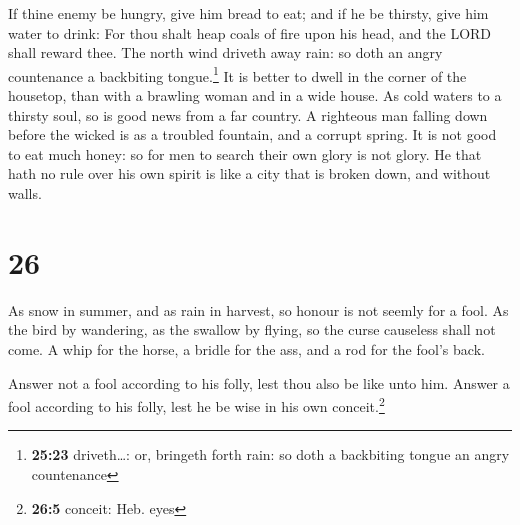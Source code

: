  If thine enemy be hungry, give him bread to eat; and if
he be thirsty, give him water to drink:  For thou shalt
heap coals of fire upon his head, and the LORD shall reward thee.
 The north wind driveth away rain: so doth an angry
countenance a backbiting tongue.\footnote{\textbf{25:23} driveth\ldots:
  or, bringeth forth rain: so doth a backbiting tongue an angry
  countenance}  It is better to dwell in the corner of
the housetop, than with a brawling woman and in a wide house.
 As cold waters to a thirsty soul, so is good news from a
far country.  A righteous man falling down before the
wicked is as a troubled fountain, and a corrupt spring. 
It is not good to eat much honey: so for men to search their own glory
is not glory.  He that hath no rule over his own spirit
is like a city that is broken down, and without walls.

\hypertarget{section-25}{%
\section{26}\label{section-25}}

 As snow in summer, and as rain in harvest, so honour is
not seemly for a fool.  As the bird by wandering, as the
swallow by flying, so the curse causeless shall not come. 
A whip for the horse, a bridle for the ass, and a rod for the fool's
back.

 Answer not a fool according to his folly, lest thou also
be like unto him.  Answer a fool according to his folly,
lest he be wise in his own conceit.\footnote{\textbf{26:5} conceit: Heb.
  eyes}

